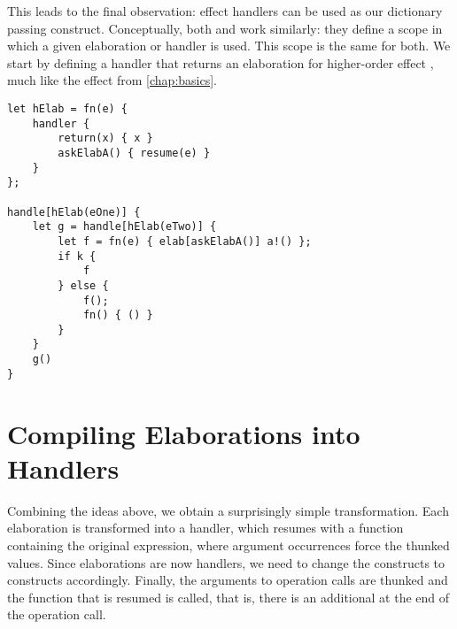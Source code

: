 This leads to the final observation: effect handlers can be used as our dictionary passing construct. Conceptually, both  and  work similarly: they define a scope in which a given elaboration or handler is used. This scope is the same for both. We start by defining a handler that returns an elaboration for higher-order effect , much like the  effect from \cref{chap:basics}.

\begin{lstlisting}[language=elaine,style=fancy]
let hElab = fn(e) {
    handler {
        return(x) { x }
        askElabA() { resume(e) }
    }
};

handle[hElab(eOne)] {
    let g = handle[hElab(eTwo)] {
        let f = fn(e) { elab[askElabA()] a!() };
        if k {
            f
        } else {
            f();
            fn() { () }
        }
    }
    g()
}
\end{lstlisting}

\section{Compiling Elaborations into Handlers}

Combining the ideas above, we obtain a surprisingly simple transformation. Each elaboration is transformed into a handler, which resumes with a function containing the original expression, where argument occurrences force the thunked values. Since elaborations are now handlers, we need to change the  constructs to  constructs accordingly. Finally, the arguments to operation calls are thunked and the function that is resumed is called, that is, there is an additional \el{()} at the end of the operation call.

